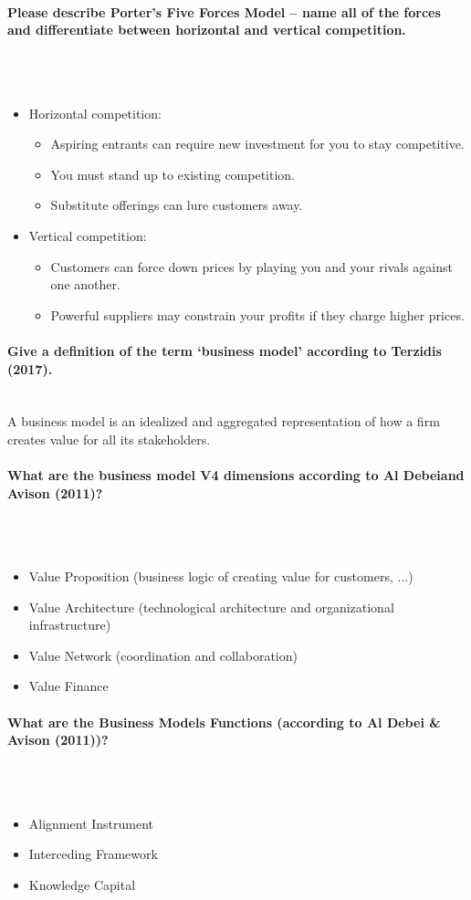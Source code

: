 \documentclass[10pt,a4paper,noendnumber=true]{scrartcl}
\newcommand{\properparagraph}[1]{\paragraph{\textcolor{Emerald}{#1}}\mbox{}\\}
\begin{document}
\properparagraph{Please describe Porter’s Five Forces Model – name all of the forces and differentiate between horizontal and vertical competition.}
\\[-6ex]
\begin{itemize}
	\item Horizontal competition:
	\begin{itemize}
		\item Aspiring entrants can require new investment for you to stay competitive.
		\item You must stand up to existing competition.
		\item Substitute offerings can lure customers away.
	\end{itemize}
	\item Vertical competition:
	\begin{itemize}
		\item Customers can force down prices by playing you and your rivals against one another.
		\item Powerful suppliers may constrain your profits if they charge higher prices.	
	\end{itemize}
\end{itemize}

\properparagraph{Give a definition of the term ‘business model’ according to Terzidis (2017).}
A business model is an idealized and aggregated representation of how a firm creates value for all its stakeholders.

\properparagraph{What are the business model V4 dimensions according to Al Debeiand Avison (2011)?}
\\[-6ex]
\begin{itemize}
	\item Value Proposition (business logic of creating value for customers, ...)
	\item Value Architecture (technological architecture and organizational infrastructure)
	\item Value Network (coordination and collaboration)
	\item Value Finance
\end{itemize}

\properparagraph{What are the Business Models Functions (according to Al Debei \& Avison (2011))?}
\\[-6ex]
\begin{itemize}
	\item Alignment Instrument
	\item Interceding Framework
	\item Knowledge Capital
\end{itemize}
\end{document}

